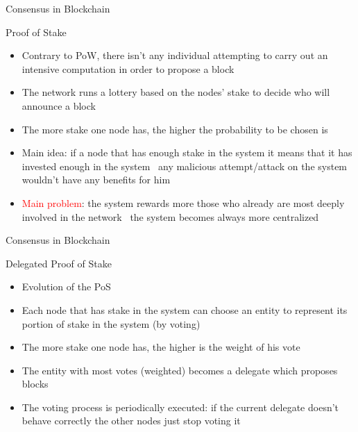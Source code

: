 \documentclass{beamer}
\newcommand\red[1]{\textcolor{red}{#1}}
\begin{document}
  \begin{frame}{Consensus in Blockchain}
    \begin{block}{Proof of Stake}
      \begin{itemize}
        \item Contrary to PoW, there isn't any individual attempting to carry out
        an intensive computation in order to propose a block \pause
        \item The network runs a lottery based on the nodes’ stake to decide
        who will announce a block \pause
        \item The more stake one node has, the higher the probability
        to be chosen is \pause
        \item Main idea: if a node that has enough stake in the system it means
        that it has invested enough in the system \MVRightarrow\, any malicious
        attempt/attack on the system wouldn't have any benefits for him \pause
        \item \red{Main problem}: the system rewards more those who already are most
        deeply involved in the network \MVRightarrow\, the system becomes always
        more centralized
      \end{itemize}
    \end{block}
  \end{frame}





  \begin{frame}{Consensus in Blockchain}
    \begin{block}{Delegated Proof of Stake}
      \begin{itemize}
        \item Evolution of the PoS \pause
        \item Each node that has stake in the system can choose an entity to
        represent its portion of stake in the system (by voting) \pause
        \item The more stake one node has, the higher is the weight of his vote \pause
        \item The entity with most votes (weighted) becomes a delegate which
        proposes blocks \pause
        \item The voting process is periodically executed: if the current delegate
        doesn't behave correctly the other nodes just stop voting it
      \end{itemize}
    \end{block}
  \end{frame}
\end{document}
